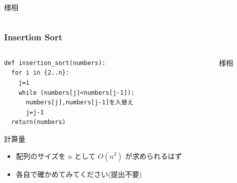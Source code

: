 \begin{frame}
\begin{columns}[t,onlytextwidth]
\begin{column}{0.55\linewidth}{様相}
\begin{center}
      \end{center}
    \end{column}
  \end{columns}
\end{frame}
\begin{frame}
\frametitle{Insertion Sort}
  \begin{columns}[t,onlytextwidth]
    \begin{column}{0.5\linewidth}
      \begin{lstlisting}[caption={擬似コード},label=insertion_sort]
def insertion_sort(numbers):
  for i in {2..n}:
    j=i
    while (numbers[j]<numbers[j-1]):
      numbers[j],numbers[j-1]を入替え
      j=j-1
  return(numbers)
      \end{lstlisting}
      \begin{itembox}[l]{計算量}
        \begin{itemize}
\tiny
\item 配列のサイズを $n$ として \(O(n^2)\) が求められるはず
\item 各自で確かめてみてください(提出不要)
        \end{itemize}
      \end{itembox}
    \end{column}
    \begin{column}{0.55\linewidth}{様相}
      \begin{center}

\end{center}
\end{column}
\end{columns}
\end{frame}
